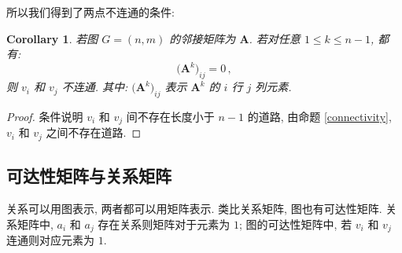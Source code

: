 \documentclass[UTF8]{ctexart}
\theoremstyle{mystyle}
\theoremstyle{myremark}
\theoremstyle{plain}
\newtheorem{corollary}{Corollary}[section]
\newcommand{\ve}[1]{\boldsymbol{\mathbf{#1}}}
\begin{document}
所以我们得到了两点不连通的条件:
\begin{corollary}
    若图 $ G = (n, m) $ 的邻接矩阵为 $ \ve A $. 若对任意 $ 1 \leqslant k \leqslant n - 1 $, 都有:
    \[ 
        \bigl( \ve A^k \bigr)_{ij} = 0 \,,
    \]
    则 $ v_i $ 和 $ v_j $ 不连通. 其中: $ \bigl( \ve A^k \bigr)_{ij} $ 表示 $ \ve A^k $ 的 $ i $ 行 $ j $ 列元素.
\end{corollary}

\begin{proof}
    条件说明 $ v_i $ 和 $ v_j $ 间不存在长度小于 $ n - 1 $ 的道路, 由命题 \ref{connectivity}, $ v_i $ 和 $ v_j $ 之间不存在道路.
\end{proof}


\subsection{可达性矩阵与关系矩阵}
关系可以用图表示, 两者都可以用矩阵表示. 类比关系矩阵, 图也有可达性矩阵. 关系矩阵中, $ a_i $ 和 $ a_j $ 存在关系则矩阵对于元素为 $ 1 $; 图的可达性矩阵中, 若 $ v_i $ 和 $ v_j $ 连通则对应元素为 $ 1 $.
\end{document}
